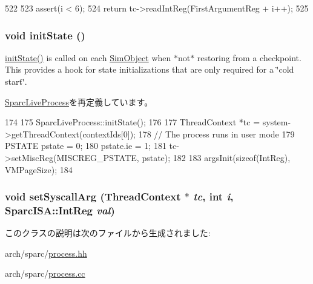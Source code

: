 \begin{DoxyCode}
522 {
523     assert(i < 6);
524     return tc->readIntReg(FirstArgumentReg + i++);
525 }
\end{DoxyCode}
\hypertarget{classSparc64LiveProcess_a3c34ea9b29f410748d4435a667484924}{
\subsubsection[{initState}]{\setlength{\rightskip}{0pt plus 5cm}void initState ()}}
\label{classSparc64LiveProcess_a3c34ea9b29f410748d4435a667484924}
\hyperlink{classSparc64LiveProcess_a3c34ea9b29f410748d4435a667484924}{initState()} is called on each \hyperlink{classSimObject}{SimObject} when $\ast$not$\ast$ restoring from a checkpoint. This provides a hook for state initializations that are only required for a \char`\"{}cold start\char`\"{}. 

\hyperlink{classSparcLiveProcess_a3c34ea9b29f410748d4435a667484924}{SparcLiveProcess}を再定義しています。


\begin{DoxyCode}
174 {
175     SparcLiveProcess::initState();
176 
177     ThreadContext *tc = system->getThreadContext(contextIds[0]);
178     // The process runs in user mode
179     PSTATE pstate = 0;
180     pstate.ie = 1;
181     tc->setMiscReg(MISCREG_PSTATE, pstate);
182 
183     argsInit(sizeof(IntReg), VMPageSize);
184 }
\end{DoxyCode}
\hypertarget{classSparc64LiveProcess_acab5265ebb2016965a75bd93006c36d3}{
\subsubsection[{setSyscallArg}]{\setlength{\rightskip}{0pt plus 5cm}void setSyscallArg ({\bf ThreadContext} $\ast$ {\em tc}, \/  int {\em i}, \/  {\bf SparcISA::IntReg} {\em val})}}
\label{classSparc64LiveProcess_acab5265ebb2016965a75bd93006c36d3}


このクラスの説明は次のファイルから生成されました:\begin{DoxyCompactItemize}
\item 
arch/sparc/\hyperlink{arch_2sparc_2process_8hh}{process.hh}\item 
arch/sparc/\hyperlink{arch_2sparc_2process_8cc}{process.cc}\end{DoxyCompactItemize}

